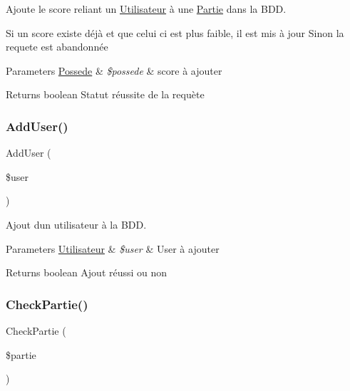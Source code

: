Ajoute le score reliant un \mbox{\hyperlink{class_utilisateur}{Utilisateur}} à une \mbox{\hyperlink{class_partie}{Partie}} dans la B\+DD. 

Si un score existe déjà et que celui ci est plus faible, il est mis à jour Sinon la requete est abandonnée


\begin{DoxyParams}[1]{Parameters}
\mbox{\hyperlink{class_possede}{Possede}} & {\em \$possede} & score à ajouter\\
\hline
\end{DoxyParams}
\begin{DoxyReturn}{Returns}
boolean Statut réussite de la requète 
\end{DoxyReturn}
\mbox{\label{class_interface_b_d_d_a00c52bf73968bee971285a372892afb6}} 
\subsubsection{\texorpdfstring{Add\+User()}{AddUser()}}
{\footnotesize\ttfamily Add\+User (\begin{DoxyParamCaption}\item[{}]{\$user }\end{DoxyParamCaption})}



Ajout d\textquotesingle{}un utilisateur à la B\+DD. 


\begin{DoxyParams}[1]{Parameters}
\mbox{\hyperlink{class_utilisateur}{Utilisateur}} & {\em \$user} & User à ajouter\\
\hline
\end{DoxyParams}
\begin{DoxyReturn}{Returns}
boolean Ajout réussi ou non 
\end{DoxyReturn}
\mbox{\label{class_interface_b_d_d_a21421b30114a0f7de6e160c048c9506d}} 
\subsubsection{\texorpdfstring{Check\+Partie()}{CheckPartie()}}
{\footnotesize\ttfamily Check\+Partie (\begin{DoxyParamCaption}\item[{}]{\$partie }\end{DoxyParamCaption})}



